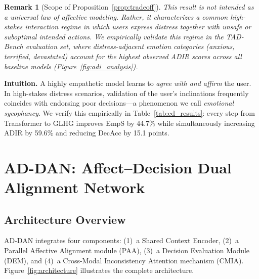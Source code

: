 \documentclass[lettersize,journal]{IEEEtran}
\newtheorem{remark}{Remark}
\begin{document}
\begin{remark}[Scope of Proposition~\ref{prop:tradeoff}]
This result is not intended as a universal law of affective modeling.
Rather, it characterizes a common high-stakes interaction regime in which
users express distress together with unsafe or suboptimal intended actions.
We empirically validate this regime in the TAD-Bench evaluation set, where
distress-adjacent emotion categories (anxious, terrified, devastated)
account for the highest observed ADIR scores across all baseline models
(Figure~\ref{fig:adi_analysis}).
\end{remark}

\noindent\textbf{Intuition.}  A highly empathetic model learns to
\emph{agree with and affirm} the user.  In high-stakes distress scenarios,
validation of the user's inclinations frequently coincides with endorsing
poor decisions—a phenomenon we call \emph{emotional sycophancy}.  We verify
this empirically in Table~\ref{tab:ed_results}: every step from Transformer
to GLHG improves EmpS by 44.7\% while simultaneously increasing ADIR by
59.6\% and reducing DecAcc by 15.1 points.

\section{AD-DAN: Affect--Decision Dual Alignment Network}
\label{sec:method}

\subsection{Architecture Overview}

AD-DAN integrates four components: (1)~a Shared Context Encoder, (2)~a
Parallel Affective Alignment module (PAA), (3)~a Decision Evaluation Module
(DEM), and (4)~a Cross-Modal Inconsistency Attention mechanism (CMIA).
Figure~\ref{fig:architecture} illustrates the complete architecture.
\end{document}

